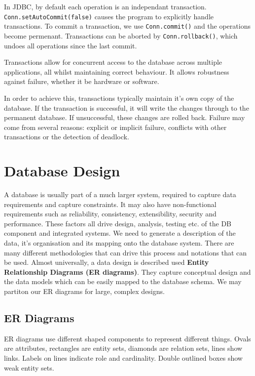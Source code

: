 \documentclass{article}
\begin{document}
	\par In JDBC, by default each operation is an independant transaction. \texttt{Conn.setAutoCommit(false)} causes the program to explicitly handle transactions. To commit a transaction, we use \texttt{Conn.commit()} and the operations become permenant. Transactions can be aborted by \texttt{Conn.rollback()}, which undoes all operations since the last commit. 
	
	\par 
	Transactions allow for concurrent access to the database across multiple applications, all whilst maintaining correct behaviour. It allows robustness against failure, whether it be hardware or software.
	
	\par In order to achieve this, transactions typically maintain it's own copy of the database. If the transaction is successful, it will write the changes through to the permanent database. If unsuccessful, these changes are rolled back. Failure may come from several reasons: explicit or implicit failure, conflicts with other transactions or the detection of deadlock.
	
	\section{Database Design}
	A database is usually part of a much larger system, required to capture data requirements and capture constraints. It may also have non-functional requirements such as reliability, consistency, extensibility, security and performance. These factors all drive design, analysis, testing etc. of the DB component and integrated systems. We need to generate a description of the data, it's organisation and its mapping onto the database system. There are many different methodologies that can drive this process and notations that can be used. Almost universally, a data design is described used \textbf{Entity Relationship Diagrams (ER diagrams)}. They capture conceptual design and the data models which can be easily mapped to the database schema. We may partiton our ER diagrams for large, complex designs. 
	
	\subsection{ER Diagrams}
	ER diagrams use different shaped components to represent different things. Ovals are attributes, rectangles are entity sets, diamonds are relation sets, lines show links. Labels on lines indicate role and cardinality. Double outlined boxes show weak entity sets.
	
\end{document}
